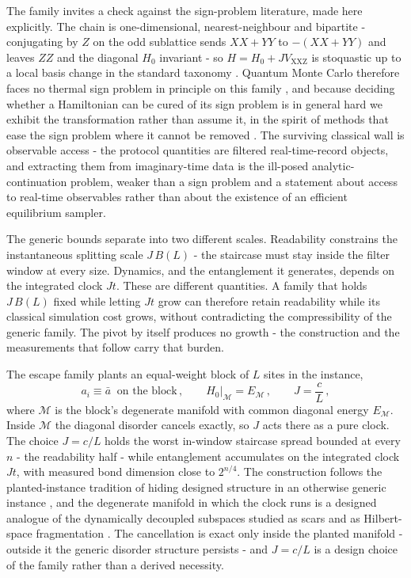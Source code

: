 The family invites a check against the sign-problem literature, made here explicitly. The chain is one-dimensional, nearest-neighbour and bipartite - conjugating by $Z$ on the odd sublattice sends $XX + YY$ to $-(XX + YY)$ and leaves $ZZ$ and the diagonal $H_{0}$ invariant - so $H = H_{0} + J V_{\mathrm{XXZ}}$ is stoquastic up to a local basis change in the standard taxonomy \cite{bravyi2008stoquastic, klassen2019stoquastic}. Quantum Monte Carlo therefore faces no thermal sign problem in principle on this family \cite{troyer2005computational}, and because deciding whether a Hamiltonian can be cured of its sign problem is in general hard \cite{marvian2019cure, klassen2019hardness} we exhibit the transformation rather than assume it, in the spirit of methods that ease the sign problem where it cannot be removed \cite{hangleiter2020easing}. The surviving classical wall is observable access - the protocol quantities are filtered real-time-record objects, and extracting them from imaginary-time data is the ill-posed analytic-continuation problem, weaker than a sign problem and a statement about access to real-time observables rather than about the existence of an efficient equilibrium sampler.

The generic bounds separate into two different scales. Readability constrains the instantaneous splitting scale $J\,B(L)$ - the staircase must stay inside the filter window at every size. Dynamics, and the entanglement it generates, depends on the integrated clock $Jt$. These are different quantities. A family that holds $J\,B(L)$ fixed while letting $Jt$ grow can therefore retain readability while its classical simulation cost grows, without contradicting the compressibility of the generic family. The pivot by itself produces no growth - the construction and the measurements that follow carry that burden.

The escape family plants an equal-weight block of $L$ sites in the instance,
\begin{equation*}
a_{i} \equiv \bar{a} \ \text{ on the block}\,, \qquad H_{0}\big|_{\mathcal{M}} = E_{\mathcal{M}}\,, \qquad J = \frac{c}{L}\,,
\end{equation*}
where $\mathcal{M}$ is the block's degenerate manifold with common diagonal energy $E_{\mathcal{M}}$. Inside $\mathcal{M}$ the diagonal disorder cancels exactly, so $J$ acts there as a pure clock. The choice $J = c/L$ holds the worst in-window staircase spread bounded at every $n$ - the readability half - while entanglement accumulates on the integrated clock $Jt$, with measured bond dimension close to $2^{n/4}$. The construction follows the planted-instance tradition of hiding designed structure in an otherwise generic instance \cite{barthel2002planted}, and the degenerate manifold in which the clock runs is a designed analogue of the dynamically decoupled subspaces studied as scars and as Hilbert-space fragmentation \cite{turner2018scars, sala2020fragmentation}. The cancellation is exact only inside the planted manifold - outside it the generic disorder structure persists - and $J = c/L$ is a design choice of the family rather than a derived necessity.


